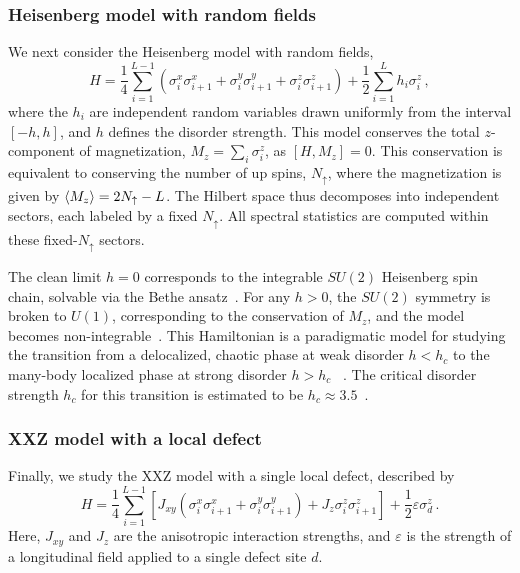 \documentclass[letterpaper,superscriptaddress,aps,pra,nolongbibliography,showpacs,floatfix,dvipsnames,10pt,twocolumn]{revtex4-2}
\begin{document}
\subsubsection{Heisenberg model with random fields}\label{sec:heisenberg}
We next consider the Heisenberg model with random fields,
\begin{equation}\label{eq:H:heisenberg}
H = \frac{1}{4}\sum_{i=1}^{L-1} \left(\sigma_i^x\sigma_{i+1}^x
+ \sigma_i^y\sigma_{i+1}^y + \sigma_i^z\sigma_{i+1}^z\right)
+ \frac{1}{2}\sum_{i=1}^L h_i \sigma_i^z \, ,
\end{equation}
where the $h_i$ are independent random variables drawn uniformly
from the interval $[-h, h]$, and $h$ defines the disorder strength.
This model conserves the total $z$-component of magnetization,
$M_z = \sum_i \sigma_i^z$, as $[H, M_z] = 0$. This conservation
is equivalent to conserving the number of up spins, $N_{\uparrow}$,
where the magnetization is given by $\ev{M_z} = 2N_{\uparrow} - L$.
The Hilbert space thus decomposes into independent sectors, each
labeled by a fixed $N_{\uparrow}$. All spectral statistics are
computed within these fixed-$N_{\uparrow}$ sectors.

The clean limit $h=0$ corresponds to the integrable $SU(2)$ Heisenberg spin
chain, solvable via the Bethe ansatz~\cite{bethe_1931_zur}. For
any $h > 0$, the $SU(2)$ symmetry is broken to $U(1)$, corresponding to the
conservation of $M_z$, and the model becomes 
non-integrable~\cite{santos_2004_integrability}. This Hamiltonian
is a paradigmatic model for studying the transition from a delocalized,
chaotic phase at weak disorder $h < h_c$ to 
the many-body localized 
phase at strong disorder $h > h_c$
~\cite{oganesyan_2007_localization,basko_2006_metal,pal_2010_manybody,luitz_2015_manybody,abanin_2019_colloquium}. 
The critical disorder strength $h_c$ for this transition is estimated to be
$h_c \approx 3.5$~\cite{luitz_2015_manybody}.

\subsubsection{XXZ model with a local defect}\label{sec:xxz}
Finally, we study the XXZ model with a single local defect,
described by
\begin{equation}\label{eq:H:xxz}
H = \frac{1}{4}\sum_{i=1}^{L-1} \left[ J_{xy}
\left(\sigma_i^x\sigma_{i+1}^x + \sigma_i^y\sigma_{i+1}^y \right)
+ J_z \sigma_i^z\sigma_{i+1}^z \right]
+ \frac{1}{2}\varepsilon \sigma_d^z \, .
\end{equation}
Here, $J_{xy}$ and $J_z$ are the anisotropic interaction strengths,
and $\varepsilon$ is the strength of a longitudinal field applied
to a single defect site $d$.
\end{document}
